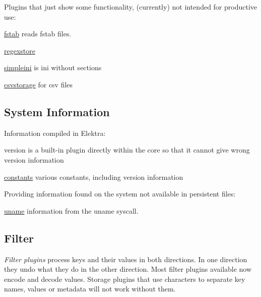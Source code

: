 Plugins that just show some functionality, (currently) not intended for productive use\+:


\begin{DoxyItemize}
\item \hyperlink{md_src_plugins_fstab_README_src_plugins_fstab_README_md}{fstab} reads fstab files.
\item \hyperlink{md_src_plugins_regexstore_README_src_plugins_regexstore_README_md}{regexstore}
\item \hyperlink{md_src_plugins_simpleini_README_src_plugins_simpleini_README_md}{simpleini} is ini without sections
\item \hyperlink{md_src_plugins_csvstorage_README_src_plugins_csvstorage_README_md}{csvstorage} for csv files
\end{DoxyItemize}

\subsection*{System Information}

Information compiled in Elektra\+:
\begin{DoxyItemize}
\item version is a built-\/in plugin directly within the core so that it cannot give wrong version information
\item \hyperlink{md_src_plugins_constants_README_src_plugins_constants_README_md}{constants} various constants, including version information
\end{DoxyItemize}

Providing information found on the system not available in persistent files\+:


\begin{DoxyItemize}
\item \hyperlink{md_src_plugins_uname_README_src_plugins_uname_README_md}{uname} information from the uname syscall.
\end{DoxyItemize}

\subsection*{Filter}

{\itshape Filter plugins} process keys and their values in both directions. In one direction they undo what they do in the other direction. Most filter plugins available now encode and decode values. Storage plugins that use characters to separate key names, values or metadata will not work without them.

